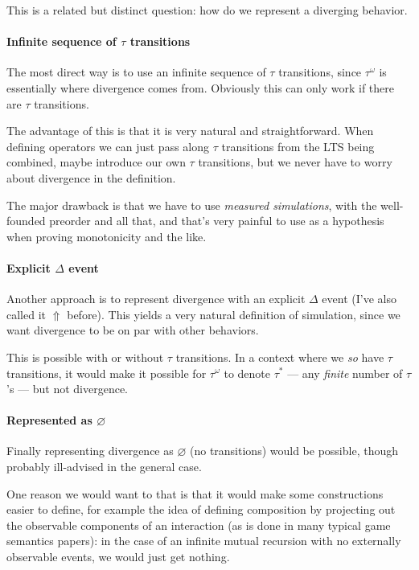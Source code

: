 \documentclass[11pt]{article}
\begin{document}
This is a related but distinct question:
how do we represent a diverging behavior.

\paragraph{Infinite sequence of $\tau$ transitions}

The most direct way is to use an infinite sequence of $\tau$ transitions,
since $\tau^\omega$ is essentially where divergence comes from.
Obviously this can only work if there are $\tau$ transitions.

The advantage of this is that it is very natural and straightforward.
When defining operators we can just pass along $\tau$ transitions from
the LTS being combined,
maybe introduce our own $\tau$ transitions,
but we never have to worry about divergence
in the definition.

The major drawback is that we have to use \emph{measured simulations},
with the well-founded preorder and all that,
and that's very painful to use as a hypothesis
when proving monotonicity and the like.

\paragraph{Explicit $\Delta$ event}

Another approach is to represent divergence
with an explicit $\Delta$ event (I've also called it $\Uparrow$ before).
This yields a very natural definition of simulation,
since we want divergence to be on par with other behaviors.

This is possible with or without $\tau$ transitions.
In a context where we \emph{so} have $\tau$ transitions,
it would make it possible for $\tau^\omega$ to denote $\tau^*$
--- any \emph{finite} number of $\tau$'s ---
but not divergence.

\paragraph{Represented as $\varnothing$}

Finally representing divergence as $\varnothing$ (no transitions)
would be possible, though probably ill-advised in the general case.

One reason we would want to that is
that it would make some constructions easier to define,
for example the idea of defining composition
by projecting out the observable components of an interaction
(as is done in many typical game semantics papers):
in the case of an infinite mutual recursion with no
externally observable events,
we would just get nothing.
\end{document}
